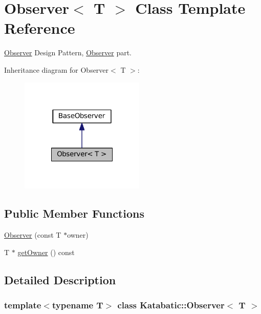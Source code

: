 \hypertarget{classKatabatic_1_1Observer}{}\section{Observer$<$ T $>$ Class Template Reference}
\label{classKatabatic_1_1Observer}


\mbox{\hyperlink{classKatabatic_1_1Observer}{Observer}} Design Pattern, \mbox{\hyperlink{classKatabatic_1_1Observer}{Observer}} part.  




Inheritance diagram for Observer$<$ T $>$\+:\nopagebreak
\begin{figure}[H]
\begin{center}
\leavevmode
\includegraphics[width=168pt]{classKatabatic_1_1Observer__inherit__graph}
\end{center}
\end{figure}
\subsection*{Public Member Functions}
\begin{DoxyCompactItemize}
\item 
\mbox{\hyperlink{classKatabatic_1_1Observer_ab05ec12517c51952960dd4f324499b44}{Observer}} (const T $\ast$owner)
\item 
T $\ast$ \mbox{\hyperlink{classKatabatic_1_1Observer_ac29b8f99d632058c95784fd7233b8474}{get\+Owner}} () const
\end{DoxyCompactItemize}


\subsection{Detailed Description}
\subsubsection*{template$<$typename T$>$\newline
class Katabatic\+::\+Observer$<$ T $>$}

